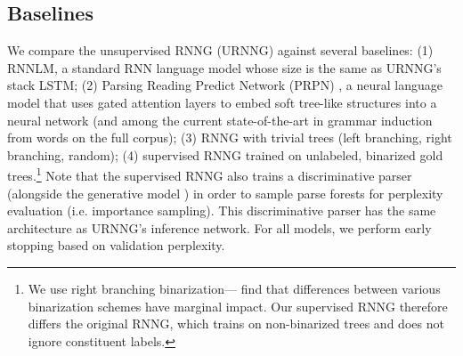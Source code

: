 \documentclass[11pt,a4paper]{article}
\begin{document}
\subsection{Baselines}{\label{sec:baselines}}
\vspace{-1mm}
We compare the unsupervised RNNG (URNNG) against several baselines: (1) RNNLM, a standard RNN language model
whose size is the same as URNNG's stack LSTM; (2) Parsing Reading Predict Network (PRPN)
\cite{shen2018nlm}, a neural language model that uses gated attention layers to embed soft tree-like structures into a neural network (and among the current state-of-the-art in grammar induction from words on the full corpus); (3) RNNG with trivial trees (left branching, right branching, random); (4) supervised RNNG trained on unlabeled, binarized gold trees.\footnote{We use right branching binarization---\citet{matsu2005pcfg} find that differences between various binarization schemes have marginal impact. Our supervised RNNG therefore differs the original RNNG, which trains on non-binarized trees and does not ignore constituent labels.} Note that the supervised RNNG also trains a discriminative parser
 (alongside the generative model ) in order to sample parse forests for perplexity evaluation (i.e. importance sampling). This discriminative parser has the same architecture as URNNG's inference network. For all models, we perform early stopping based on validation perplexity.
\vspace{-3mm}
\end{document}

